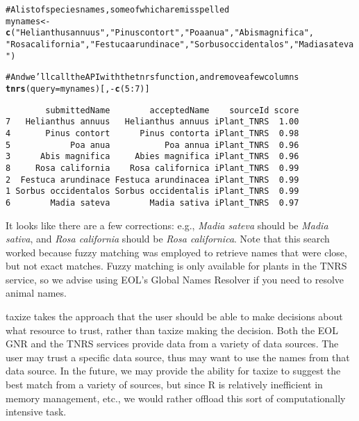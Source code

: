 \documentclass[10pt]{article}\usepackage{graphicx, color}
\makeatletter
\newcommand{\hlfunctioncall}[1]{\textcolor[rgb]{0.501960784313725,0,0.329411764705882}{\textbf{#1}}}%
\newcommand{\hlstring}[1]{\textcolor[rgb]{0.6,0.6,1}{#1}}%
\newcommand{\hlcomment}[1]{\textcolor[rgb]{0.180392156862745,0.6,0.341176470588235}{#1}}%
\newenvironment{kframe}{%
 \def\at@end@of@kframe{}%
 \ifinner\ifhmode%
  \def\at@end@of@kframe{\end{minipage}}%
  \begin{minipage}{\columnwidth}%
 \fi\fi%
 \def\FrameCommand##1{\hskip\@totalleftmargin \hskip-\fboxsep
 \colorbox{shadecolor}{##1}\hskip-\fboxsep
     \hskip-\linewidth \hskip-\@totalleftmargin \hskip\columnwidth}%
 \MakeFramed {\advance\hsize-\width
   \@totalleftmargin\z@ \linewidth\hsize
   \@setminipage}}%
 {\par\unskip\endMakeFramed%
 \at@end@of@kframe}
\newenvironment{knitrout}{}{} %
\makeatother
\begin{document}
\begin{knitrout}
\color{fgcolor}\begin{kframe}
\begin{alltt}
\hlcomment{# A list of species names, some of which are misspelled}
mynames <- \hlfunctioncall{c}(\hlstring{"Helianthus annuus"}, \hlstring{"Pinus contort"}, \hlstring{"Poa anua"}, \hlstring{"Abis magnifica"}, 
    \hlstring{"Rosa california"}, \hlstring{"Festuca arundinace"}, \hlstring{"Sorbus occidentalos"}, \hlstring{"Madia sateva"})

\hlcomment{# And we'll call the API with the tnrs function, and remove a few columns}
\hlfunctioncall{tnrs}(query = mynames)[, -\hlfunctioncall{c}(5:7)]
\end{alltt}
\begin{verbatim}
        submittedName        acceptedName    sourceId score
7   Helianthus annuus   Helianthus annuus iPlant_TNRS  1.00
4       Pinus contort      Pinus contorta iPlant_TNRS  0.98
5            Poa anua           Poa annua iPlant_TNRS  0.96
3      Abis magnifica     Abies magnifica iPlant_TNRS  0.96
8     Rosa california    Rosa californica iPlant_TNRS  0.99
2  Festuca arundinace Festuca arundinacea iPlant_TNRS  0.99
1 Sorbus occidentalos Sorbus occidentalis iPlant_TNRS  0.99
6        Madia sateva        Madia sativa iPlant_TNRS  0.97
\end{verbatim}
\end{kframe}
\end{knitrout}


It looks like there are a few corrections: e.g., \emph{Madia sateva} should be \emph{Madia sativa}, and \emph{Rosa california} should be \emph{Rosa californica}. Note that this search worked because fuzzy matching was employed to retrieve names that were close, but not exact matches. Fuzzy matching is only available for plants in the TNRS service, so we advise using EOL's Global Names Resolver if you need to resolve animal names.

taxize takes the approach that the user should be able to make decisions about what resource to trust, rather than taxize making the decision. Both the EOL GNR and the TNRS services provide data from a variety of data sources. The user may trust a specific data source, thus may want to use the names from that data source. In the future, we may provide the ability for taxize to suggest the best match from a variety of sources, but since R is relatively inefficient in memory management, etc., we would rather offload this sort of computationally intensive task.
\end{document}

